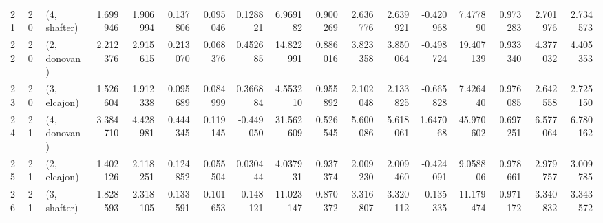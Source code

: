 \begin{tabular}{lllrrrrrrrrrrrrrr}
21 &    20 &  (4, shafter) &  1.699946 &  1.906994 &   0.137806 &  0.095046 &  0.128821 &   6.969182 &  0.900269 &   2.636776 &  2.639921 & -0.420968 &   7.477890 &  0.973283 &  2.701976 &  2.734573 \\
22 &    20 &  (2, donovan) &  2.212376 &  2.915615 &   0.213070 &  0.068376 &  0.452685 &  14.822991 &  0.886016 &   3.823358 &  3.850064 & -0.498724 &  19.407139 &  0.933340 &  4.377032 &  4.405353 \\
23 &    20 &  (3, elcajon) &  1.526604 &  1.912338 &   0.095689 &  0.084999 &  0.366884 &   4.553210 &  0.955892 &   2.102048 &  2.133825 & -0.665828 &   7.426440 &  0.976085 &  2.642558 &  2.725150 \\
24 &    21 &  (4, donovan) &  3.384710 &  4.428981 &   0.444345 &  0.119145 & -0.449050 &  31.562609 &  0.526545 &   5.600086 &  5.618061 &  1.647068 &  45.970602 &  0.697251 &  6.577064 &  6.780162 \\
25 &    21 &  (2, elcajon) &  1.402126 &  2.118251 &   0.124852 &  0.055504 &  0.030444 &   4.037931 &  0.937374 &   2.009230 &  2.009460 & -0.424091 &   9.058806 &  0.978661 &  2.979757 &  3.009785 \\
26 &    21 &  (3, shafter) &  1.828593 &  2.318105 &   0.133591 &  0.101653 & -0.148121 &  11.023147 &  0.870372 &   3.316807 &  3.320112 & -0.135335 &  11.179474 &  0.971172 &  3.340832 &  3.343572 \\
\bottomrule
\end{tabular}
